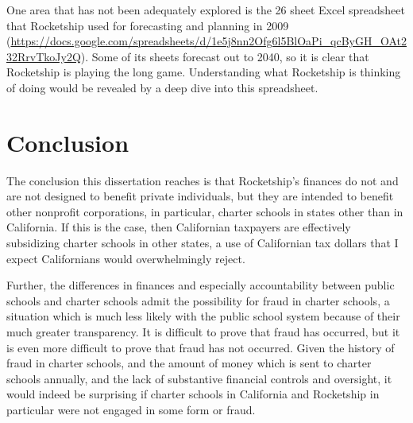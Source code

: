 One area that has not been adequately explored is the 26 sheet Excel spreadsheet that Rocketship used for forecasting and planning in 2009 (\url{https://docs.google.com/spreadsheets/d/1e5j8nn2Ofg6l5BlOaPi_qcByGH_OAt232RrvTkoJy2Q}). Some of its sheets forecast out to 2040, so it is clear that Rocketship is playing the long game. Understanding what Rocketship is thinking of doing would be revealed by a deep dive into this spreadsheet.

\section{Conclusion}%
\label{sec:conclusion}\indent%

The conclusion this dissertation reaches is that Rocketship's finances do not and are not designed to benefit private individuals, but they are intended to benefit other nonprofit corporations, in particular, charter schools in states other than in California. If this is the case, then Californian taxpayers are effectively subsidizing charter schools in other states, a use of Californian tax dollars that I expect Californians would overwhelmingly reject.

Further, the differences in finances and especially accountability between public schools and charter schools admit the possibility for fraud in charter schools, a situation which is much less likely with the public school system because of their much greater transparency. It is difficult to prove that fraud has occurred, but it is even more difficult to prove that fraud has not occurred. Given the history of fraud in charter schools, and the amount of money which is sent to charter schools annually, and the lack of substantive financial controls and oversight, it would indeed be surprising if charter schools in California and Rocketship in particular were not engaged in some form or fraud.

